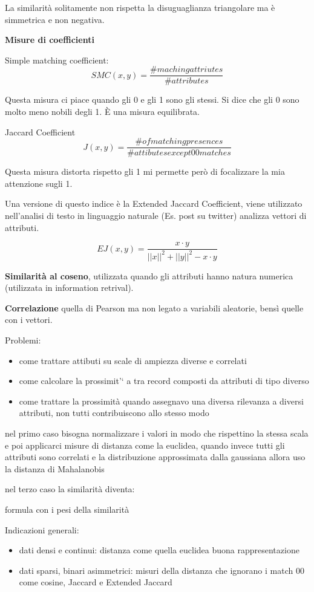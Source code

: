 La similarit\`a solitamente non rispetta la disuguaglianza triangolare ma \`e simmetrica e non negativa. 

\textbf{Misure di coefficienti}

Simple matching coefficient: \[ SMC(x,y) = \frac{\#maching attriutes}{\#attributes} \]

Questa misura ci piace quando gli 0 e gli 1 sono gli stessi. Si dice che gli 0 sono molto meno nobili degli 1. \`E una misura equilibrata.

Jaccard Coefficient \[ J(x,y) = \frac{\#of matching presences}{\# attibutes except 00 matches}\]

Questa misura distorta rispetto gli 1 mi permette per\`o di focalizzare la mia attenzione sugli 1. 

Una versione di questo indice \`e la Extended Jaccard Coefficient, viene utilizzato nell'analisi di testo in linguaggio naturale (Es. post su twitter) analizza vettori di attributi.

\[ EJ(x,y) = \frac{x \cdot y}{||x||^2 + ||y||^2 - x \cdot y}\]


\textbf{Similarit\`a al coseno}, utilizzata quando gli attributi hanno natura numerica (utilizzata in information retrival).

\textbf{Correlazione} quella di Pearson ma non legato a variabili aleatorie, bensì quelle con i vettori. 

Problemi:
\begin{itemize}
	\item come trattare attibuti su scale di ampiezza diverse e correlati
	\item come calcolare la prossimit'` a tra record composti da attributi di tipo diverso
	\item come trattare la prossimit\`a quando assegnavo una diversa rilevanza a diversi attributi, non tutti contribuiscono allo stesso modo
\end{itemize}

nel primo caso bisogna normalizzare i valori in modo che rispettino la stessa scala e poi applicarci misure di distanza come la euclidea, quando invece tutti gli attributi sono correlati e la distribuzione approssimata dalla gaussiana allora uso la distanza di Mahalanobis

nel terzo caso la similarit\`a diventa:

formula con i pesi della similarit\`a 

Indicazioni generali:

\begin{itemize}
	\item dati densi e continui: distanza come quella euclidea buona rappresentazione
	\item dati sparsi, binari asimmetrici: misuri della distanza che ignorano i match 00 come cosine, Jaccard e Extended Jaccard
\end{itemize}

